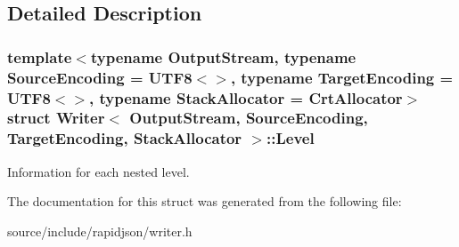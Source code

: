 \subsection{Detailed Description}
\subsubsection*{template$<$typename Output\+Stream, typename Source\+Encoding = U\+T\+F8$<$$>$, typename Target\+Encoding = U\+T\+F8$<$$>$, typename Stack\+Allocator = Crt\+Allocator$>$struct Writer$<$ Output\+Stream, Source\+Encoding, Target\+Encoding, Stack\+Allocator $>$\+::\+Level}

Information for each nested level. 

The documentation for this struct was generated from the following file\+:\begin{DoxyCompactItemize}
\item 
source/include/rapidjson/writer.\+h\end{DoxyCompactItemize}
